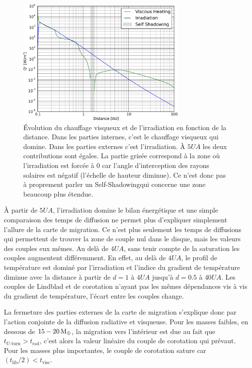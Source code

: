 \begin{figure}[htbp]
\centering
\includegraphics[width=0.75\textwidth]{figure/migration_map/viscous_vs_irradiation.pdf}

\caption{Évolution du chauffage visqueux et de l'irradiation en fonction de la distance. Dans les parties internes, c'est le
chauffage visqueux qui domine. Dans les parties externes c'est l'irradiation. À $5\unit{UA}$ les deux contributions sont
égales. La partie grisée correspond à la zone où l'irradiation est forcée à 0 car l'angle d'interception des rayons solaires est négatif (l'échelle de hauteur diminue). Ce n'est donc pas à proprement parler un \og Self-Shadowing\fg qui concerne une zone beaucoup plus étendue.}\label{fig:viscous_vs_irradiation}
\end{figure}

À partir de $5\unit{UA}$, l'irradiation domine le bilan énergétique  et une simple comparaison des temps de diffusion ne permet plus d'expliquer simplement l'allure de la carte de migration. Ce n'est plus seulement les temps de diffusions qui permettent de trouver la zone de couple nul dans le disque, mais les valeurs des couples eux mêmes. Au delà de $4\unit{UA}$, sans tenir compte de la saturation les couples augmentent différemment. En effet, au delà de $4\unit{UA}$, le profil de température est dominé par l'irradiation et l'indice du gradient de température diminue avec la distance à partir de $d=1$ à $4\unit{UA}$ jusqu'à $d=0.5$ à $40\unit{UA}$. Les couples de Lindblad et de corotation n'ayant pas les mêmes dépendances vis à vis du gradient de température, l'écart entre les couples change.

La fermeture des parties externes de la carte de migration s'explique donc par l'action conjointe de la diffusion radiative et visqueuse. Pour les masses
faibles, en dessous de $15-20\mathrm{\thinspace M_\oplus}$, la migration vers l'intérieur est due au fait que $t_\text{U-turn} > t_\text{rad}$, c'est
alors la valeur linéaire du couple de corotation qui prévaut. Pour les masses plus importantes, le couple de corotation sature
car $(t_\text{lib}/2) < t_\text{visc}$. 

